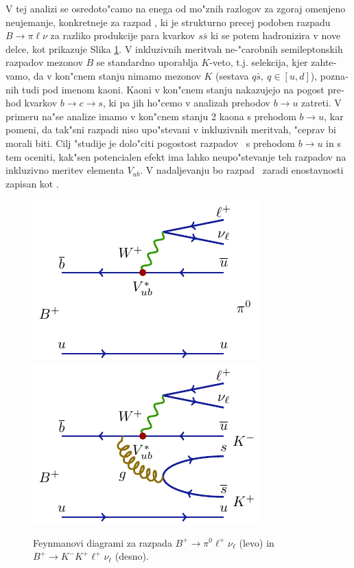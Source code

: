 \begin{otherlanguage}{slovene}
V tej analizi se osredoto"camo na enega od mo"znih razlogov za zgoraj omenjeno neujemanje, konkretneje za razpad \decayb, ki je strukturno precej podoben razpadu $B \to \pi \ell \nu$ za razliko produkcije para kvarkov $s \bar s$ ki se potem hadronizira v nove delce, kot prikazuje Slika \ref{feynman_si}. V inkluzivnih meritvah ne-"carobnih semileptonskih razpadov mezonov $B$ se standardno uporablja $K$-veto, t.j. selekcija, kjer zahtevamo, da v kon"cnem stanju nimamo mezonov $K$ (sestava $q \bar s,~q \in [u,d]$), poznanih tudi pod imenom kaoni. Kaoni v kon"cnem stanju nakazujejo na pogost prehod kvarkov $b \to c \to s$, ki pa jih ho"cemo v analizah prehodov $b \to u$ zatreti. V primeru na"se analize imamo v kon"cnem stanju 2 kaona s prehodom $b \to u$, kar pomeni, da tak"sni razpadi niso upo"stevani v inkluzivnih meritvah, "ceprav bi morali biti. Cilj "studije je dolo"citi pogostost razpadov \decayb~s prehodom $b\to u$ in s tem oceniti, kak"sen potencialen efekt ima lahko neupo"stevanje teh razpadov na inkluzivno meritev elementa $V_{ub}$. V nadaljevanju bo razpad \decayb~zaradi enostavnosti zapisan kot \decaya.
\begin{figure}[H]
\centering
\includegraphics{texfig/B2pilnu}
\hspace{1cm}
\includegraphics{texfig/B2KKlnu}
	\captionsetup{width=0.8\linewidth}
\caption{Feynmanovi diagrami za razpada $B^+ \to \pi^0 \ell^+ \nu_\ell$ (levo) in $B^+ \to K^- K^+ \ell^+ \nu_\ell$ (desno).}
\label{feynman_si}
\end{figure}


\end{otherlanguage}
